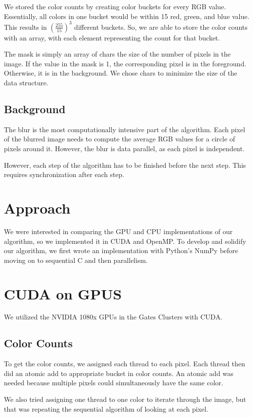 \documentclass[12pt]{article}
\begin{document}
We stored the color counts by creating color buckets for every RGB value.
Essentially, all colors in one bucket would be within 15 red, green, and blue
value. This results in $\left(\tfrac{255}{15}\right)^3$ different buckets.
So, we are able to store the color counts with an array, with each element
representing the count for that bucket.

The mask is simply an array of chars the size of the number of pixels in the
image. If the value in the mask is 1, the corresponding pixel is in the
foreground. Otherwise, it is in the background. We chose chars to minimize the
size of the data structure.

\subsection{Background}
The blur is the most computationally intensive part of the algorithm. Each pixel
of the blurred image needs to compute the average RGB values for a circle
of pixels around it. However, the blur is data parallel, as each pixel is
independent.

However, each step of the algorithm has to be finished before the next step.
This requires synchronization after each step.

\section{Approach}
We were interested in comparing the GPU and CPU implementations of
our algorithm, so we implemented it in CUDA and OpenMP.
To develop and solidify our algorithm, we first wrote an implementation with
Python's NumPy before moving on to sequential C and then parallelism.

\section{CUDA on GPUS}
We utilized the NVIDIA 1080x GPUs in the Gates Clusters with CUDA.

\subsection{Color Counts}
To get the color counts, we assigned each thread to each pixel. Each thread then
did an atomic add to appropriate bucket in color counts. An atomic add was
needed because multiple pixels could simultaneously have the same color.

We also tried assigning one thread to one color to iterate through the image,
but that was repeating the sequential algorithm of looking at each pixel.
\end{document}
